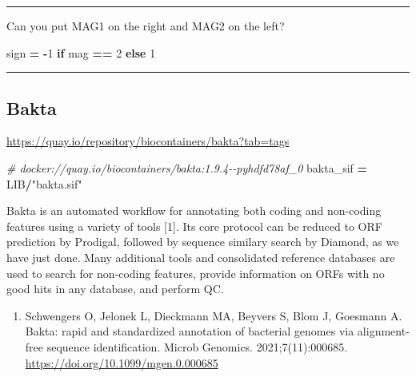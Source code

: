 \documentclass[
]{book}
\newenvironment{Shaded}{\begin{snugshade}}{\end{snugshade}}
\newcommand{\CommentTok}[1]{\textcolor[rgb]{0.56,0.35,0.01}{\textit{#1}}}
\newcommand{\ControlFlowTok}[1]{\textcolor[rgb]{0.13,0.29,0.53}{\textbf{#1}}}
\newcommand{\DecValTok}[1]{\textcolor[rgb]{0.00,0.00,0.81}{#1}}
\newcommand{\NormalTok}[1]{#1}
\newcommand{\OperatorTok}[1]{\textcolor[rgb]{0.81,0.36,0.00}{\textbf{#1}}}
\newcommand{\StringTok}[1]{\textcolor[rgb]{0.31,0.60,0.02}{#1}}
\providecommand{\tightlist}{%
  \setlength{\itemsep}{0pt}\setlength{\parskip}{0pt}}
\begin{document}
\begin{center}\rule{0.5\linewidth}{0.5pt}\end{center}

Can you put MAG1 on the right and MAG2 on the left?

\begin{Shaded}
\begin{Highlighting}[numbers=left,,]
\NormalTok{    sign }\OperatorTok{=} \OperatorTok{{-}}\DecValTok{1} \ControlFlowTok{if}\NormalTok{ mag }\OperatorTok{==} \DecValTok{2} \ControlFlowTok{else} \DecValTok{1}
\end{Highlighting}
\end{Shaded}

\begin{center}\rule{0.5\linewidth}{0.5pt}\end{center}

\subsection{Bakta}\label{bakta}

\url{https://quay.io/repository/biocontainers/bakta?tab=tags}

\begin{Shaded}
\begin{Highlighting}[numbers=left,,]
\CommentTok{\# docker://quay.io/biocontainers/bakta:1.9.4{-}{-}pyhdfd78af\_0}
\NormalTok{bakta\_sif }\OperatorTok{=}\NormalTok{ LIB}\OperatorTok{/}\StringTok{"bakta.sif"}
\end{Highlighting}
\end{Shaded}

Bakta is an automated workflow for annotating both coding and non-coding features using a variety of tools {[}1{]}.
Its core protocol can be reduced to ORF prediction by Prodigal, followed by sequence similary search by Diamond, as we have just done.
Many additional tools and consolidated reference databases are used to search for non-coding features, provide information on ORFs with no good hits in any database, and perform QC.

\begin{enumerate}
\def\labelenumi{\arabic{enumi}.}
\tightlist
\item
  Schwengers O, Jelonek L, Dieckmann MA, Beyvers S, Blom J, Goesmann A. Bakta: rapid and standardized annotation of bacterial genomes via alignment-free sequence identification. Microb Genomics. 2021;7(11):000685. \url{https://doi.org/10.1099/mgen.0.000685}
\end{enumerate}
\end{document}
